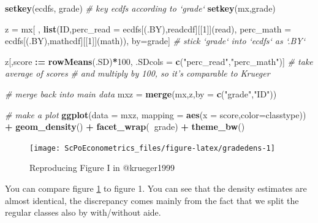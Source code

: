 \documentclass[]{book}
\newenvironment{Shaded}{\begin{snugshade}}{\end{snugshade}}
\newcommand{\CommentTok}[1]{\textcolor[rgb]{0.56,0.35,0.01}{\textit{#1}}}
\newcommand{\DataTypeTok}[1]{\textcolor[rgb]{0.13,0.29,0.53}{#1}}
\newcommand{\DecValTok}[1]{\textcolor[rgb]{0.00,0.00,0.81}{#1}}
\newcommand{\ErrorTok}[1]{\textcolor[rgb]{0.64,0.00,0.00}{\textbf{#1}}}
\newcommand{\KeywordTok}[1]{\textcolor[rgb]{0.13,0.29,0.53}{\textbf{#1}}}
\newcommand{\NormalTok}[1]{#1}
\newcommand{\OperatorTok}[1]{\textcolor[rgb]{0.81,0.36,0.00}{\textbf{#1}}}
\newcommand{\StringTok}[1]{\textcolor[rgb]{0.31,0.60,0.02}{#1}}
\begin{document}
\begin{Shaded}
\begin{Highlighting}[]
\KeywordTok{setkey}\NormalTok{(ecdfs, grade)  }\CommentTok{# key ecdfs according to `grade`}
\KeywordTok{setkey}\NormalTok{(mx,grade)}

\NormalTok{z =}\StringTok{ }\NormalTok{mx[ , }\KeywordTok{list}\NormalTok{(ID,}\DataTypeTok{perc_read =}\NormalTok{ ecdfs[(.BY),readcdf][[}\DecValTok{1}\NormalTok{]](read),}
               \DataTypeTok{perc_math =}\NormalTok{ ecdfs[(.BY),mathcdf][[}\DecValTok{1}\NormalTok{]](math)),}
\NormalTok{        by=grade]   }\CommentTok{# stick `grade` into `ecdfs` as `.BY`}

\NormalTok{z[,score }\OperatorTok{:}\ErrorTok{=}\StringTok{ }\KeywordTok{rowMeans}\NormalTok{(.SD)}\OperatorTok{*}\DecValTok{100}\NormalTok{, .SDcols =}\StringTok{ }\KeywordTok{c}\NormalTok{(}\StringTok{"perc_read"}\NormalTok{,}\StringTok{"perc_math"}\NormalTok{)]  }\CommentTok{# take average of scores}
\CommentTok{# and multiply by 100, so it's comparable to Krueger}

\CommentTok{# merge back into main data}
\NormalTok{mxz =}\StringTok{ }\KeywordTok{merge}\NormalTok{(mx,z,}\DataTypeTok{by =} \KeywordTok{c}\NormalTok{(}\StringTok{"grade"}\NormalTok{,}\StringTok{"ID"}\NormalTok{))}

\CommentTok{# make a plot}
\KeywordTok{ggplot}\NormalTok{(}\DataTypeTok{data =}\NormalTok{ mxz, }\DataTypeTok{mapping =} \KeywordTok{aes}\NormalTok{(}\DataTypeTok{x =}\NormalTok{ score,}\DataTypeTok{color=}\NormalTok{classtype)) }\OperatorTok{+}\StringTok{ }\KeywordTok{geom_density}\NormalTok{() }\OperatorTok{+}\StringTok{ }\KeywordTok{facet_wrap}\NormalTok{(}\OperatorTok{~}\NormalTok{grade) }\OperatorTok{+}\StringTok{ }\KeywordTok{theme_bw}\NormalTok{()}
\end{Highlighting}
\end{Shaded}

\begin{figure}

{\centering \texttt{[image: ScPoEconometrics\_files/figure-latex/gradedens-1]} 

}

\caption{Reproducing Figure I in @krueger1999}\label{fig:gradedens}
\end{figure}

You can compare figure \ref{fig:gradedens} to \citet{krueger1999} figure 1. You can see that the density estimates are almost identical, the discrepancy comes mainly from the fact that we split the regular classes also by with/without aide.
\end{document}
